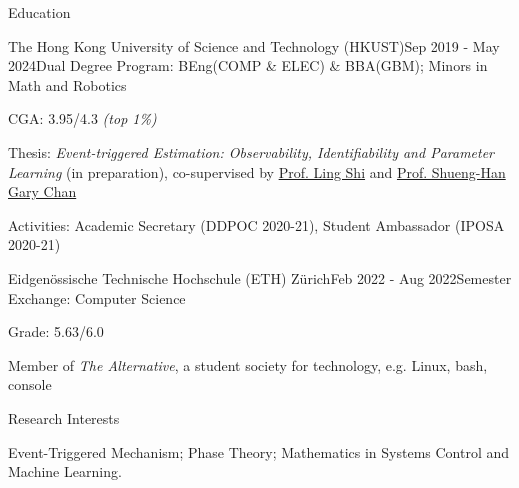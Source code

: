 \documentclass{resume}
\begin{document}
\begin{rSection}{Education}

    \begin{rSubsection}{The Hong Kong University of Science and Technology (HKUST)}{Sep 2019 - May 2024}{Dual Degree Program: BEng(COMP \& ELEC) \& BBA(GBM); Minors in Math and Robotics}{}
        \item CGA: 3.95/4.3 \emph{(top 1\%)}
        \item Thesis: \emph{Event-triggered Estimation: Observability, Identifiability and Parameter Learning} (in preparation),
        co-supervised by \href{https://eesling.home.ece.ust.hk/}{Prof. Ling Shi} and \href{https://www.cse.ust.hk/~gchan/}{Prof. Shueng-Han Gary Chan}
        \item Activities: Academic Secretary (DDPOC 2020-21), Student Ambassador (IPOSA 2020-21)
    \end{rSubsection}
    
    \begin{rSubsection}{Eidgenössische Technische Hochschule (ETH) Zürich}{Feb 2022 - Aug 2022}{Semester Exchange: Computer Science}{}
        \item Grade: 5.63/6.0
        \item Member of \emph{The Alternative}, a student society for technology, e.g. Linux, bash, console
    \end{rSubsection}

\end{rSection}

\begin{rSection}{Research Interests}

    Event-Triggered Mechanism; Phase Theory; Mathematics in Systems Control and Machine Learning. 

\end{rSection}
\end{document}
